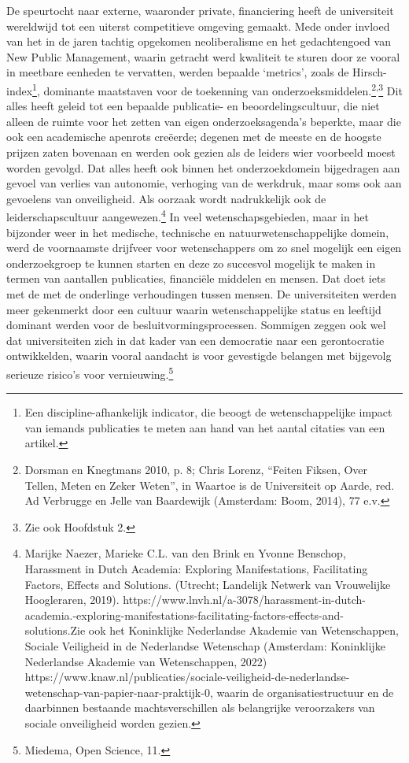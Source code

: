\documentclass{jote-book}
\begin{document}
	De speurtocht naar externe, waaronder private, financiering heeft de universiteit wereldwijd tot een uiterst competitieve omgeving gemaakt. Mede onder invloed van het in de jaren tachtig opgekomen neoliberalisme en het gedachtengoed van New Public Management, waarin getracht werd kwaliteit te sturen door ze vooral in meetbare eenheden te vervatten, werden bepaalde ‘metrics', zoals de Hirsch-index\footnote{Een discipline-afhankelijk indicator, die beoogt de wetenschappelijke impact van iemands publicaties te meten aan hand van het aantal citaties van een artikel. }, dominante maatstaven voor de toekenning van onderzoeksmiddelen.\footnote{Dorsman en Knegtmans 2010, p. 8; Chris Lorenz, “Feiten Fiksen, Over Tellen, Meten en Zeker Weten”, in Waartoe is de Universiteit op Aarde, red. Ad Verbrugge en Jelle van Baardewijk (Amsterdam: Boom, 2014), 77 e.v.}\textsuperscript{,}\footnote{Zie ook Hoofdstuk 2.} Dit alles heeft geleid tot een bepaalde publicatie- en beoordelingscultuur, die niet alleen de ruimte voor het zetten van eigen onderzoeksagenda's beperkte, maar die ook een academische apenrots creëerde; degenen met de meeste en de hoogste prijzen zaten bovenaan en werden ook gezien als de leiders wier voorbeeld moest worden gevolgd. Dat alles heeft ook binnen het onderzoekdomein bijgedragen aan gevoel van verlies van autonomie, verhoging van de werkdruk, maar soms ook aan gevoelens van onveiligheid. Als oorzaak wordt nadrukkelijk ook de leiderschapscultuur aangewezen.\footnote{Marijke Naezer, Marieke C.L. van den Brink en Yvonne Benschop, Harassment in Dutch Academia: Exploring Manifestations, Facilitating Factors, Effects and Solutions. (Utrecht; Landelijk Netwerk van Vrouwelijke Hoogleraren, 2019). https://www.lnvh.nl/a-3078/harassment-in-dutch-academia.-exploring-manifestations-facilitating-factors-effects-and-solutions.Zie ook het Koninklijke Nederlandse Akademie van Wetenschappen, Sociale Veiligheid in de Nederlandse Wetenschap (Amsterdam: Koninklijke Nederlandse Akademie van Wetenschappen, 2022) https://www.knaw.nl/publicaties/sociale-veiligheid-de-nederlandse-wetenschap-van-papier-naar-praktijk-0, waarin de organisatiestructuur en de daarbinnen bestaande machtsverschillen als belangrijke veroorzakers van sociale onveiligheid worden gezien.} In veel wetenschapsgebieden, maar in het bijzonder weer in het medische, technische en natuurwetenschappelijke domein, werd de voornaamste drijfveer voor wetenschappers om zo snel mogelijk een eigen onderzoekgroep te kunnen starten en deze zo succesvol mogelijk te maken in termen van aantallen publicaties, financiële middelen en mensen. Dat doet iets met de met de onderlinge verhoudingen tussen mensen. De universiteiten werden meer gekenmerkt door een cultuur waarin wetenschappelijke status en leeftijd dominant werden voor de besluitvormingsprocessen. Sommigen zeggen ook wel dat universiteiten zich in dat kader van een democratie naar een gerontocratie ontwikkelden, waarin vooral aandacht is voor gevestigde belangen met bijgevolg serieuze risico's voor vernieuwing.\footnote{Miedema, Open Science, 11.}
\end{document}
